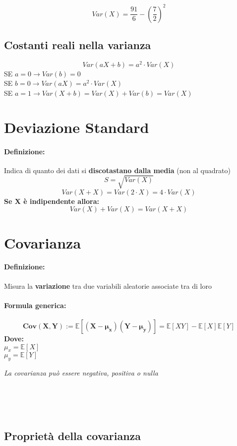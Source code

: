 \documentclass[]{article}
\newcommand{\ev}{\mathbb{E}[X]}
\renewcommand{\ev}[1]{\mathbb{E}[#1]}
\newcommand{\definizione}{\paragraph{Definizione:}}
\newcommand{\formula}{\paragraph{Formula generica:}}
\begin{document}
    \[ Var(X) = \frac{91}{6} - (\frac{7}{2})^2 \]

    \subsection{Costanti reali nella varianza}
    \[ Var(aX + b) = a^2 \cdot Var(X) \]
    SE $a = 0 \longrightarrow Var(b) = 0$ \\
    SE $b = 0 \longrightarrow Var(aX) = a^2 \cdot Var(X)$ \\
    SE $a = 1 \longrightarrow Var(X + b) = Var(X) + {Var(b)} = Var(X)$ \\

    \section{Deviazione Standard}
    \definizione Indica di quanto dei dati si \textbf{discotastano dalla media} (non al quadrato)
    \[ S = \sqrt{Var(X)} \]
    \[ Var(X + X) = Var(2 \cdot X) = 4 \cdot Var(X) \]
    \linebreak[1]
    \textbf{Se X è indipendente allora:}
    \[ Var(X) + Var(X) = Var(X + X) \]

    \section{Covarianza}
    \definizione Misura la \textbf{variazione} tra due variabili aleatorie associate tra di loro
    \formula \[ \boldsymbol{Cov(X,Y) := \ev{(X - \mu_x) (Y - \mu_y)}} = \ev{XY} - \ev{X} \ev{Y} \]
    \textbf{Dove:} \\
    $ \mu_x = \ev{X} $ \\
    $ \mu_y = \ev{Y} $

    \begin{center} 
        \textit{La covarianza può essere negativa, positiva o nulla } 
    \end{center}
     \\
     \\
     \\

    \subsection{Proprietà della covarianza}
    
\end{document}
